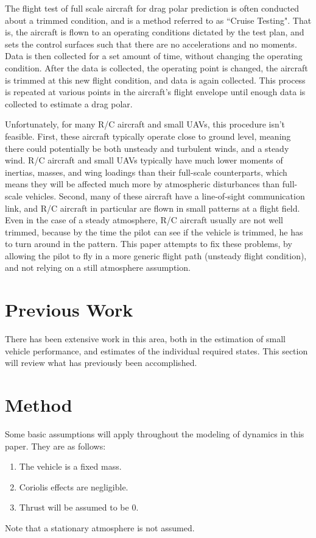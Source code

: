 \documentclass[]{aiaa-tc}%
\begin{document}
\indent
The flight test of full scale aircraft for drag polar prediction is often conducted about a trimmed condition, and is a method referred to as ``Cruise Testing"\cite{olson2000aircraft}. That is, the aircraft is flown to an operating conditions dictated by the test plan, and sets the control surfaces such that there are no accelerations and no moments. Data is then collected for a set amount of time, without changing the operating condition. After the data is collected, the operating point is changed, the aircraft is trimmed at this new flight condition, and data is again collected. This process is repeated at various points in the aircraft's flight envelope until enough data is collected to estimate a drag polar.

\indent
Unfortunately, for many R/C aircraft and small UAVs, this procedure isn't feasible. First, these aircraft typically operate close to ground level, meaning there could potentially be both unsteady and turbulent winds, and a steady wind. R/C aircraft and small UAVs typically have much lower moments of inertias, masses, and wing loadings than their full-scale counterparts, which means they will be affected much more by atmospheric disturbances than full-scale vehicles. Second, many of these aircraft have a line-of-sight communication link, and R/C aircraft in particular are flown in small patterns at a flight field. Even in the case of a steady atmosphere, R/C aircraft usually are not well trimmed, because by the time the pilot can see if the vehicle is trimmed, he has to turn around in the pattern. This paper attempts to fix these problems, by allowing the pilot to fly in a more generic flight path (unsteady flight condition), and not relying on a still atmosphere assumption.
\section{Previous Work}

There has been extensive work in this area, both in the estimation of small vehicle performance, and estimates of the individual required states. This section will review what has previously been accomplished.


\section{Method}
\label{background-information}
Some basic assumptions will apply throughout the modeling of dynamics in this paper. They are as follows:
\begin{enumerate}
\item The vehicle is a fixed mass.
\item Coriolis effects are negligible.
\item Thrust will be assumed to be 0.
\end{enumerate}
Note that a stationary atmosphere is not assumed.
\end{document}
